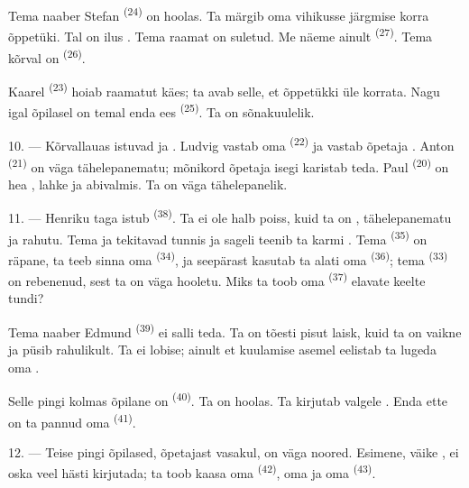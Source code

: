 Tema naaber Stefan \textsuperscript{(24)} on hoolas. Ta märgib oma vihikusse järgmise
korra õppetüki. Tal on ilus . Tema raamat on suletud. Me näeme ainult
 \textsuperscript{(27)}. Tema kõrval on 
\textsuperscript{(26)}.

Kaarel \textsuperscript{(23)} hoiab raamatut käes; ta avab selle, et õppetükki üle
korrata. Nagu igal õpilasel on temal enda ees 
\textsuperscript{(25)}. Ta on sõnakuulelik.

10. --- Kõrvallauas istuvad  ja . Ludvig vastab
oma  \textsuperscript{(22)} ja vastab õpetaja .
Anton \textsuperscript{(21)} on väga tähelepanematu; mõnikord õpetaja isegi karistab
teda. Paul \textsuperscript{(20)} on hea , lahke ja abivalmis. Ta on
väga tähelepanelik.

\VUsaut{4.2mm}
\VUsaut{3.2mm}

11. --- Henriku taga istub  \textsuperscript{(38)}. Ta ei ole halb poiss,
kuid ta on , tähelepanematu ja rahutu. Tema  ja
 tekitavad tunnis  ja sageli teenib ta karmi
. Tema  \textsuperscript{(35)} on räpane, ta
teeb sinna  oma  \textsuperscript{(34)}, ja
seepärast kasutab ta alati oma  \textsuperscript{(36)}; tema
 \textsuperscript{(33)} on rebenenud, sest ta on väga hooletu. Miks ta
toob oma  \textsuperscript{(37)} elavate keelte tundi?

Tema naaber Edmund \textsuperscript{(39)} ei salli teda. Ta on tõesti pisut laisk,
kuid ta on vaikne ja püsib rahulikult. Ta ei lobise; ainult et kuulamise asemel
eelistab ta lugeda oma  .

Selle pingi kolmas õpilane on  \textsuperscript{(40)}. Ta on hoolas. Ta
kirjutab valgele . Enda ette on ta pannud oma
 \textsuperscript{(41)}.

12. --- Teise pingi õpilased, õpetajast vasakul, on väga noored. Esimene, väike
, ei oska veel hästi kirjutada; ta toob kaasa oma
 \textsuperscript{(42)}, oma  ja oma
 \textsuperscript{(43)}.

